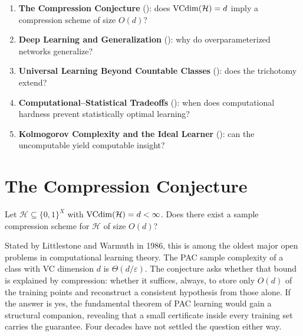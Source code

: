 \begin{enumerate}[leftmargin=*,itemsep=2pt]
\item \textbf{The Compression Conjecture} ():
  does $\mathrm{VCdim}(\mathcal{H}) = d$ imply a compression scheme of size $O(d)$?
\item \textbf{Deep Learning and Generalization}
  (): why do overparameterized networks
  generalize?
\item \textbf{Universal Learning Beyond Countable Classes}
  (): does the trichotomy extend?
\item \textbf{Computational--Statistical Tradeoffs}
  (): when does computational hardness prevent
  statistically optimal learning?
\item \textbf{Kolmogorov Complexity and the Ideal Learner}
  (): can the uncomputable yield computable
  insight?
\end{enumerate}



\section{The Compression Conjecture}
\label{sec:compression-conjecture}

\begin{openprob}
\label{op:compression-frontiers}
Let $\mathcal{H} \subseteq \{0,1\}^X$ with $\mathrm{VCdim}(\mathcal{H}) = d < \infty$.
Does there exist a sample compression scheme for $\mathcal{H}$ of size
$O(d)$?
\end{openprob}

Stated by Littlestone and Warmuth in 1986, this is among the oldest major open problems in computational learning theory.  The PAC sample complexity of a class with VC dimension $d$ is $\Theta(d/\varepsilon)$.  The conjecture asks whether that bound is explained by compression: whether it suffices, always, to store only $O(d)$ of the training points and reconstruct a consistent hypothesis from those alone.  If the answer is yes, the fundamental theorem of PAC learning would gain a structural companion, revealing that a small certificate inside every training set carries the guarantee.  Four decades have not settled the question either way.

